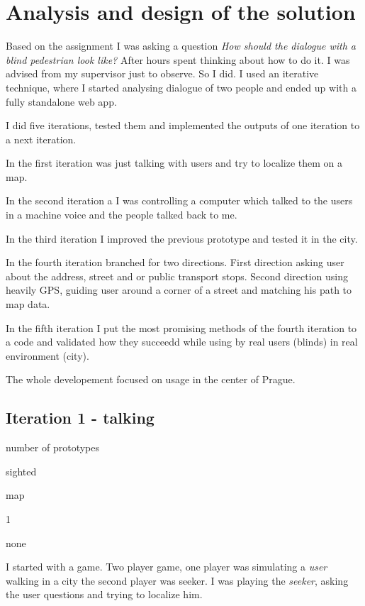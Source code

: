 	\chapter{Analysis and design of the solution}
	Based on the assignment I was asking a question \emph{How should the dialogue with a blind pedestrian look like?} After hours spent thinking about how to do it. I was advised from my supervisor just to observe. So I did. I used an iterative technique, where I started analysing dialogue of two people and ended up with a fully standalone web app.
	
	I did five iterations, tested them and implemented the outputs of one iteration to a next iteration.
	
	In the first iteration was just talking with users and try to localize them on a map.
	
	In the second iteration a I was controlling a computer which talked to the users in a machine voice and the people talked back to me.
	
	In the third iteration I improved the previous prototype and tested it in the city.
	
	In the fourth iteration branched for two directions. First direction asking user about the address, street and or public transport stops. Second direction using heavily GPS, guiding user around a corner of a street and matching his path to map data.
	
	In the fifth iteration I put the most promising methods of the fourth iteration to a code and validated how they succeedd while using by real users (blinds) in real environment (city).
	
	The whole developement focused on usage in the center of Prague.
	\section{Iteration 1 - talking}
	\label{sec:FirstExperiment}
	
	\begin{labeling}{number of prototypes}
		\item [people] sighted
		\item [environment] map
		\item [number of prototypes] 1
		\item [implementation] none
	\end{labeling}
	
	I started with a game. Two player game, one player was simulating a \emph{ user} walking in a city the second player was seeker. I was playing the \emph{seeker}, asking the user questions and trying to localize him.
	
